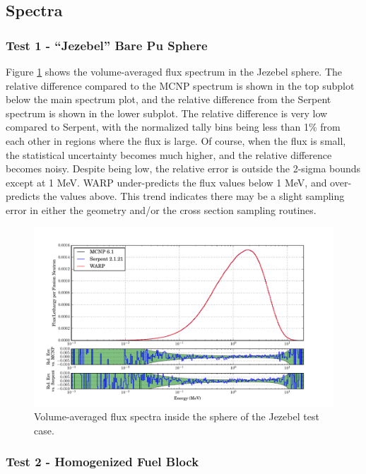 \documentclass[preprint,12pt]{elsarticle}
\begin{document}
\subsection{Spectra}

\subsubsection{Test 1 - ``Jezebel'' Bare Pu Sphere}

Figure \ref{jezebel_spec} shows the volume-averaged flux spectrum in the Jezebel sphere.  The relative difference compared to the MCNP spectrum is shown in the top subplot below the main spectrum plot, and the relative difference from the Serpent spectrum is shown in the lower subplot.  The relative difference is very low compared to Serpent, with the normalized tally bins being less than 1\% from each other in regions where the flux is large.  Of course, when the flux is small, the statistical uncertainty becomes much higher, and the relative difference becomes noisy.   Despite being low, the relative error is outside the 2-sigma bounds except at 1 MeV.  WARP under-predicts the flux values below 1 MeV, and over-predicts the values above.  This trend indicates there may be a slight sampling error in either the geometry and/or the cross section sampling routines. 

\begin{figure}[h!]
\centering
\includegraphics[width=\textwidth,trim= 1cm 0cm 1cm 0cm]{graphics/jezebel_spec.pdf}
\caption{Volume-averaged flux spectra inside the sphere of the Jezebel test case. \label{jezebel_spec} }
\end{figure}

\newpage
\subsubsection{Test 2 - Homogenized Fuel Block}
\end{document}
